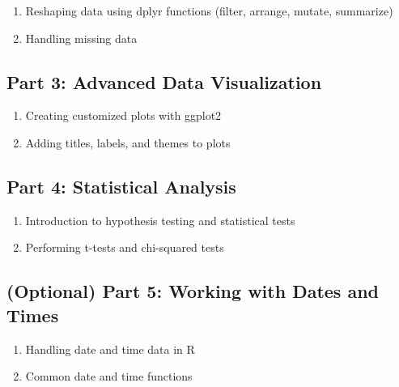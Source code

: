 \documentclass[
]{book}
\providecommand{\tightlist}{%
  \setlength{\itemsep}{0pt}\setlength{\parskip}{0pt}}
\begin{document}
\begin{enumerate}
\def\labelenumi{\arabic{enumi}.}
\tightlist
\item
  Reshaping data using dplyr functions (filter, arrange, mutate, summarize)
\item
  Handling missing data
\end{enumerate}

\subsection*{Part 3: Advanced Data Visualization}\label{part-3-advanced-data-visualization}

\begin{enumerate}
\def\labelenumi{\arabic{enumi}.}
\tightlist
\item
  Creating customized plots with ggplot2
\item
  Adding titles, labels, and themes to plots
\end{enumerate}

\subsection*{Part 4: Statistical Analysis}\label{part-4-statistical-analysis}

\begin{enumerate}
\def\labelenumi{\arabic{enumi}.}
\tightlist
\item
  Introduction to hypothesis testing and statistical tests
\item
  Performing t-tests and chi-squared tests
\end{enumerate}

\subsection*{(Optional) Part 5: Working with Dates and Times}\label{optional-part-5-working-with-dates-and-times}

\begin{enumerate}
\def\labelenumi{\arabic{enumi}.}
\tightlist
\item
  Handling date and time data in R
\item
  Common date and time functions
\end{enumerate}
\end{document}
